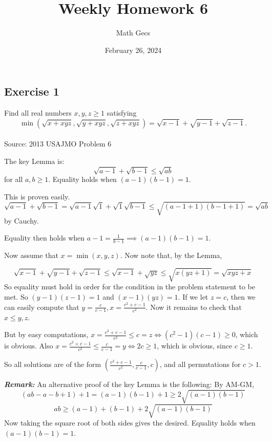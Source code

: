 \documentclass[12pt]{article}
\title{Weekly Homework 6}
\author{Math Gecs}
\date{February 26, 2024}
\begin{document}
\maketitle

\subsection*{Exercise 1}
Find all real numbers $x,y,z\geq 1$ satisfying $$\min(\sqrt{x+xyz},\sqrt{y+xyz},\sqrt{z+xyz})=\sqrt{x-1}+\sqrt{y-1}+\sqrt{z-1}.$$\\

Source: 2013 USAJMO Problem 6\\

\begin{solution}
The key Lemma is:
$$\sqrt{a-1}+\sqrt{b-1} \le \sqrt{ab}$$ for all $a,b \ge 1$. Equality holds when $(a-1)(b-1)=1$.

This is proven easily.
$$\sqrt{a-1}+\sqrt{b-1} = \sqrt{a-1}\sqrt{1}+\sqrt{1}\sqrt{b-1} \le \sqrt{(a-1+1)(b-1+1)} = \sqrt{ab}$$ by Cauchy.

Equality then holds when $a-1 =\frac{1}{b-1} \implies (a-1)(b-1) = 1$.

Now assume that $x = \min(x,y,z)$. Now note that, by the Lemma,

$$\sqrt{x-1}+\sqrt{y-1}+\sqrt{z-1} \le \sqrt{x-1} + \sqrt{yz} \le \sqrt{x(yz+1)} = \sqrt{xyz+x}$$
So equality must hold in order for the condition in the problem statement to be met.
So $(y-1)(z-1) = 1$ and $(x-1)(yz) = 1$. If we let $z = c$, then we can easily compute that $y = \frac{c}{c-1}, x = \frac{c^2+c-1}{c^2}$.
Now it remains to check that $x \le y, z$.

But by easy computations, $x = \frac{c^2+c-1}{c^2} \le c = z \Longleftrightarrow (c^2-1)(c-1) \ge 0$, which is obvious.
Also $x = \frac{c^2+c-1}{c^2} \le \frac{c}{c-1} = y \Longleftrightarrow 2c \ge 1$, which is obvious, since $c \ge 1$.

So all solutions are of the form $\boxed{\left(\frac{c^2+c-1}{c^2}, \frac{c}{c-1}, c\right)}$, and all permutations for $c > 1$.

\textbf{\textit{Remark:}} An alternative proof of the key Lemma is the following:
By AM-GM, 
$$(ab-a-b+1)+1 = (a-1)(b-1) + 1 \ge 2\sqrt{(a-1)(b-1)}$$
$$ab\ge (a-1)+(b-1)+2\sqrt{(a-1)(b-1)}$$
Now taking the square root of both sides gives the desired. Equality holds when $(a-1)(b-1) = 1$.

\end{solution}
\end{document}

